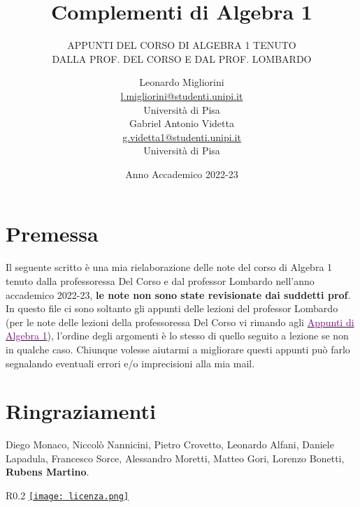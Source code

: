 \documentclass[11pt]{scrartcl}
\begin{document}
\title{Complementi di Algebra 1}
\subtitle{\large\normalfont\rmfamily\scshape APPUNTI DEL CORSO DI ALGEBRA 1 TENUTO\\ DALLA PROF. DEL CORSO E DAL PROF. LOMBARDO}
\author{Leonardo Migliorini \\ \textnormal{\href{l.migliorini@studenti.unipi.it}{l.migliorini@studenti.unipi.it}} \\ Università di Pisa \\[0.3in] Gabriel Antonio Videtta \\ \textnormal{\href{g.videtta1@studenti.unipi.it}{g.videtta1@studenti.unipi.it}} \\ Università di Pisa}
\date{Anno Accademico 2022-23}
\maketitle
\newpage

\tableofcontents

\newpage

\section*{Premessa}
Il seguente scritto è una mia rielaborazione delle note del corso di Algebra 1 tenuto dalla professoressa Del Corso e dal professor Lombardo nell'anno accademico 
2022-23, \textbf{le note non sono state revisionate dai suddetti prof}. In questo file ci sono soltanto gli appunti delle lezioni del professor Lombardo (per
le note delle lezioni della professoressa Del Corso vi rimando agli \href{https://github.com/diego-unipi/Algebra-1}{\textcolor{purple}{Appunti di Algebra 1}}), l'ordine degli argomenti è lo stesso di quello seguito a lezione se non 
in qualche caso.
Chiunque volesse aiutarmi a migliorare questi appunti può farlo segnalando eventuali errori e/o imprecisioni alla mia mail.

\section*{Ringraziamenti}

Diego Monaco, Niccolò Nannicini, Pietro Crovetto, Leonardo Alfani, Daniele
Lapadula, Francesco Sorce, Alessandro Moretti, Matteo Gori, Lorenzo Bonetti, \textbf{Rubens Martino}.

\mbox{}
\vfill
\begin{wrapfigure}{R}{0.2\textwidth}
	\centering
	\href{https://creativecommons.org/licenses/by-nc/4.0/deed.it}{\texttt{[image: licenza.png]}}
\end{wrapfigure}
\end{document}
